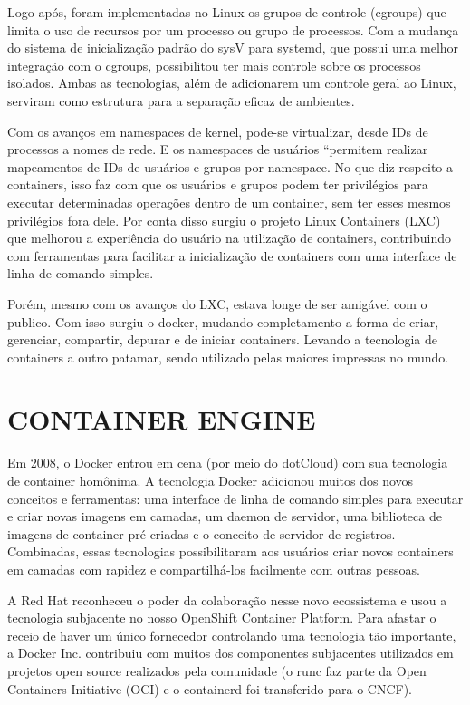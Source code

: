 Logo após, foram implementadas no Linux os grupos de controle (cgroups) que limita o uso de recursos por um processo ou grupo de processos. Com a mudança do sistema de inicialização padrão do sysV para systemd, que possui uma melhor integração com o cgroups, possibilitou ter mais controle sobre os processos isolados. Ambas as tecnologias, além de adicionarem um controle geral ao Linux, serviram como estrutura para a separação eficaz de ambientes.

Com os avanços em namespaces de kernel, pode-se virtualizar, desde IDs de processos a nomes de rede. E os namespaces de usuários “permitem realizar mapeamentos de IDs de usuários e grupos por namespace. No que diz respeito a containers, isso faz com que os usuários e grupos podem ter privilégios para executar determinadas operações dentro de um container, sem ter esses mesmos privilégios fora dele. Por conta disso surgiu o projeto Linux Containers (LXC) que melhorou a experiência do usuário na utilização de containers, contribuindo com ferramentas para facilitar a inicialização de containers com uma interface de linha de comando simples.

Porém, mesmo com os avanços do LXC, estava longe de ser amigável com o publico. Com isso surgiu o docker, mudando completamento a forma de criar, gerenciar, compartir, depurar e de iniciar containers. Levando a tecnologia de containers a outro patamar, sendo utilizado pelas maiores impressas no mundo. 

\section{CONTAINER ENGINE}
\label{sec:countainerEngine}

Em 2008, o Docker entrou em cena (por meio do dotCloud) com sua tecnologia de container homônima. A tecnologia Docker adicionou muitos dos novos conceitos e ferramentas: uma interface de linha de comando simples para executar e criar novas imagens em camadas, um daemon de servidor, uma biblioteca de imagens de container pré-criadas e o conceito de servidor de registros. Combinadas, essas tecnologias possibilitaram aos usuários criar novos containers em camadas com rapidez e compartilhá-los facilmente com outras pessoas.

A Red Hat reconheceu o poder da colaboração nesse novo ecossistema e usou a tecnologia subjacente no nosso OpenShift Container Platform. Para afastar o receio de haver um único fornecedor controlando uma tecnologia tão importante, a Docker Inc. contribuiu com muitos dos componentes subjacentes utilizados em projetos open source realizados pela comunidade (o runc faz parte da Open Containers Initiative (OCI) e o containerd foi transferido para o CNCF).

